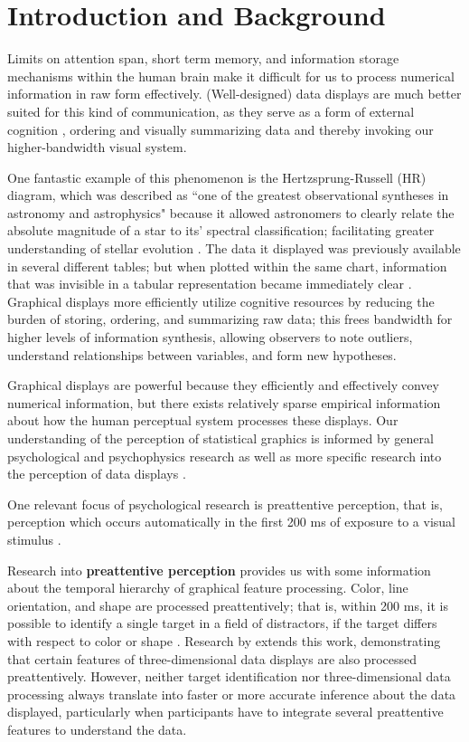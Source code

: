 \documentclass[12pt]{article}\usepackage[]{graphicx}\usepackage[]{color}
\begin{document}
\newpage
{} %

\newpage
\section{Introduction and Background}
Limits on attention span, short term memory, and information storage mechanisms within the human brain make it difficult for us to process numerical information  in raw form effectively. 
(Well-designed) data displays are much better suited for this kind of communication, as  they serve as a form of external cognition \citep{zhang1997nature,scaife1996external}, ordering and visually summarizing data
and thereby invoking our higher-bandwidth visual system. 

One fantastic example of this phenomenon is the Hertzsprung-Russell (HR) diagram, which was described as ``one of the greatest observational syntheses in astronomy and astrophysics" because it allowed astronomers to clearly relate the absolute magnitude of a star to its' spectral classification; facilitating greater understanding of stellar evolution \citep{spence1993remarkable}. 
The data it displayed was previously available in several different tables; but when plotted within the same chart, information that was invisible in a tabular representation became immediately clear \citep{lewandowsky1989perception}. 
Graphical displays more efficiently utilize cognitive resources by reducing the burden of storing, ordering, and summarizing raw data; this frees bandwidth for higher levels of information synthesis, allowing observers to note outliers, understand relationships between variables, and form new hypotheses.

Graphical displays are powerful because they efficiently and effectively convey numerical information, but there exists  relatively sparse empirical information about how the human perceptual system processes these displays. Our understanding of the perception of statistical graphics is informed by general psychological and psychophysics research as well as more specific research into the perception of data displays \citep{cleveland:1984}. 

One relevant focus of psychological research is preattentive perception, that is, perception which occurs automatically in the first 200 ms of exposure to a visual stimulus \citep{treisman1985preattentive}. 

Research into {\bf preattentive perception} provides us with some information about the temporal hierarchy of graphical feature processing. Color, line orientation, and shape are processed preattentively; that is, within 200 ms, it is possible to identify a single target in a field of distractors, if the target differs with respect to color or shape \citep{goldstein2009encyclopedia}. 
Research by \citet{healey1999large} extends this work, demonstrating that certain features of three-dimensional data displays are also processed preattentively. However, neither target identification nor three-dimensional data processing always translate into faster or more accurate inference about the data displayed, particularly when participants have to integrate several preattentive features to understand the data. 
\end{document}
